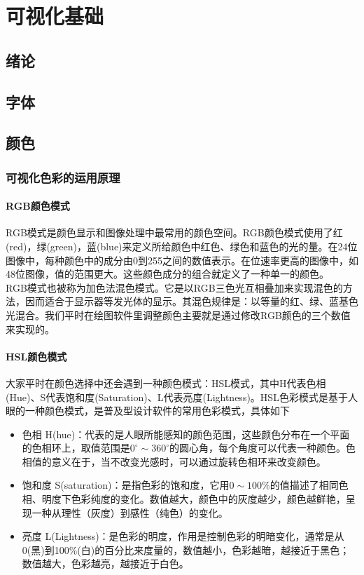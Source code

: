 \documentclass[openany]{progbookcn}
\begin{document}
\chapter{可视化基础}
\section{绪论}
\section{字体}
\section{颜色}
\subsection{可视化色彩的运用原理}
\subsubsection{RGB颜色模式}
\indent RGB模式是颜色显示和图像处理中最常用的颜色空间。RGB颜色模式使用了红(red)，绿(green)，蓝(blue)来定义所给颜色中红色、绿色和蓝色的光的量。在24位图像中，每种颜色中的成分由0到255之间的数值表示。在位速率更高的图像中，如48位图像，值的范围更大。这些颜色成分的组合就定义了一种单一的颜色。\\
\indent RGB模式也被称为加色法混色模式。它是以RGB三色光互相叠加来实现混色的方法，因而适合于显示器等发光体的显示。其混色规律是：以等量的红、绿、蓝基色光混合。我们平时在绘图软件里调整颜色主要就是通过修改RGB颜色的三个数值来实现的。
\subsubsection{HSL颜色模式}
\indent 大家平时在颜色选择中还会遇到一种颜色模式：HSL模式，其中H代表色相(Hue)、S代表饱和度(Saturation)、L代表亮度(Lightness)。HSL色彩模式是基于人眼的一种颜色模式，是普及型设计软件的常用色彩模式，具体如下
\begin{itemize}
    \item 色相 H(hue)：代表的是人眼所能感知的颜色范围，这些颜色分布在一个平面的色相环上，取值范围是$0^{\circ}\sim 360^{\circ}$的圆心角，每个角度可以代表一种颜色。色相值的意义在于，当不改变光感时，可以通过旋转色相环来改变颜色。
    \item 饱和度 S(saturation)：是指色彩的饱和度，它用$0\sim 100\% $的值描述了相同色相、明度下色彩纯度的变化。数值越大，颜色中的灰度越少，颜色越鲜艳，呈现一种从理性（灰度）到感性（纯色）的变化。
    \item 亮度 L(Lightness)：是色彩的明度，作用是控制色彩的明暗变化，通常是从0(黑)到100\%(白)的百分比来度量的，数值越小，色彩越暗，越接近于黑色；数值越大，色彩越亮，越接近于白色。
\end{itemize}
\end{document}
